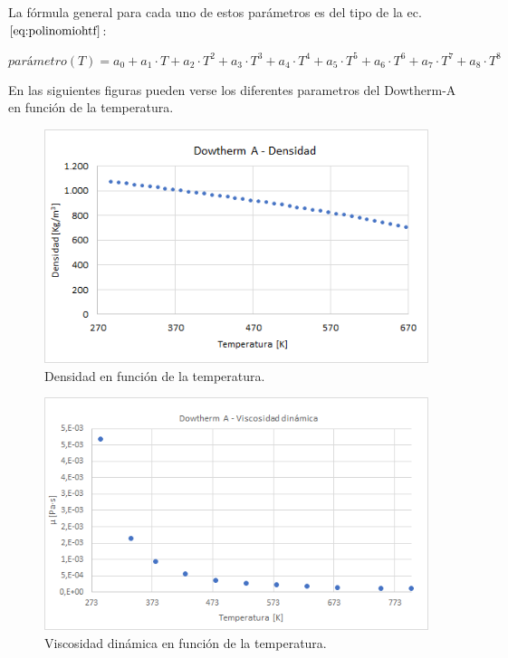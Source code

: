 La fórmula general para cada uno de estos parámetros es del tipo de la
ec.\(\eqref{eq:polinomiohtf}\):

\begin{equation}
   parámetro(T) = a_0 + a_1 \cdot T + a_2 \cdot T^2 + a_3 \cdot T^3 + a_4 \cdot T^4 + a_5 \cdot T^5 + a_6 \cdot T^6 +  a_7 \cdot T^7 + a_8 \cdot T^8   
    \label{eq:polinomiohtf}
\end{equation}

En las siguientes figuras pueden verse los diferentes parametros del
Dowtherm-A en función de la temperatura.

\begin{figure}
\includegraphics[scale=0.8]{images/curva_densidad.png}
\caption{Densidad en función de la temperatura.} 
\label{fig:curvadensidad}
\end{figure}

\begin{figure}
\includegraphics[scale=0.8]{images/curva_viscosidad.png}
\caption{Viscosidad dinámica en función de la temperatura.} 
\label{fig:curvaviscosidad}
\end{figure}

